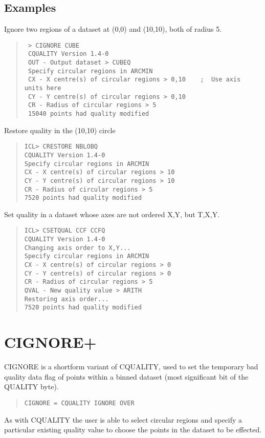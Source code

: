 \documentclass{book}
\renewcommand{\_}{{\tt\char'137}}     %
\begin{document}
\subsection{Examples}
Ignore two regions of a dataset at (0,0) and (10,10), both of radius 5.
\begin{quote}\begin{verbatim}
 > CIGNORE CUBE
 CQUALITY Version 1.4-0
 OUT - Output dataset > CUBEQ
 Specify circular regions in ARCMIN
 CX - X centre(s) of circular regions > 0,10    ;  Use axis units here
 CY - Y centre(s) of circular regions > 0,10
 CR - Radius of circular regions > 5
 15040 points had quality modified
\end{verbatim}\end{quote}
Restore quality in the (10,10) circle
\begin{quote}\begin{verbatim}
ICL> CRESTORE NBLOBQ
CQUALITY Version 1.4-0
Specify circular regions in ARCMIN
CX - X centre(s) of circular regions > 10
CY - Y centre(s) of circular regions > 10
CR - Radius of circular regions > 5
7520 points had quality modified
\end{verbatim}\end{quote}
Set quality in a dataset whose axes are not ordered X,Y, but T,X,Y.
\begin{quote}\begin{verbatim}
ICL> CSETQUAL CCF CCFQ
CQUALITY Version 1.4-0
Changing axis order to X,Y...
Specify circular regions in ARCMIN
CX - X centre(s) of circular regions > 0
CY - Y centre(s) of circular regions > 0
CR - Radius of circular regions > 5
QVAL - New quality value > ARITH
Restoring axis order...
7520 points had quality modified
\end{verbatim}\end{quote}
\section{CIGNORE+}
CIGNORE is a shortform variant of CQUALITY, used to set the
temporary bad quality data flag of points within a binned
dataset (most significant bit of the QUALITY byte).
 
\begin{quote}\begin{verbatim}
CIGNORE = CQUALITY IGNORE OVER
\end{verbatim}\end{quote}
As with CQUALITY the user is able to select circular regions and
specify a particular existing quality value to choose the points
in the dataset to be effected.
 
\end{document}
